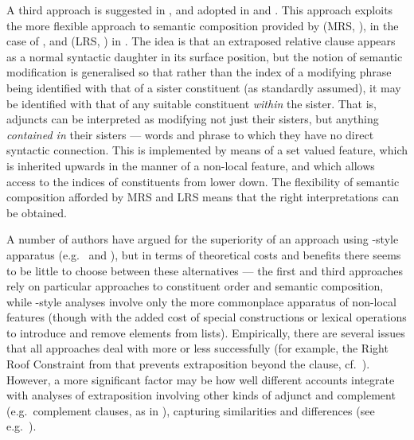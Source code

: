 \documentclass[output=paper
 	        ,biblatex
                ,babelshorthands
                ,newtxmath
                ,draftmode
                ,colorlinks, citecolor=brown
]{langscibook}
\begin{document}
A third approach is suggested in \cite{Kiss2005a}, and adopted in \cite{Crysmann2004a} and
\cite{Walker2017}. This
approach exploits the more flexible approach to semantic composition provided by  (MRS, \citealt{CFPS2005a}), in the case of \cite{Kiss2005a}, and  (LRS, \citealt{richtersailer-lrs04}) in \cite{Walker2017}. The idea is
that an extraposed relative clause appears as a normal syntactic daughter in its surface
position, but the notion of semantic modification is generalised so that rather than the
index of a modifying phrase being identified with that of a sister constituent (as
standardly assumed), it may be identified with that of any suitable constituent
\emph{within} the sister. That is, adjuncts can be interpreted as modifying not just their sisters, but
anything \emph{contained in} their sisters --- words and phrase to which they have no
direct syntactic connection.  This is implemented by means of a set valued
 feature, which is inherited upwards in the manner of a non-local
feature, and which allows access to the indices of constituents from lower down. The
flexibility of semantic composition afforded by MRS and LRS means that the right
interpretations can be obtained.

A number of authors have argued for the superiority of an approach using
-style apparatus (e.g.\ \citealt{Mueller2004b} and \citealt{Crysmann2013a}), but in
terms of theoretical costs and benefits there seems to be little to choose between these
alternatives --- the first and third approaches rely on particular approaches to constituent order
and semantic composition, while -style analyses involve only the more
commonplace apparatus of non-local features (though with the added cost of special
constructions or lexical operations to introduce and remove elements from 
lists). Empirically, there are several issues that all approaches deal with more or less
successfully (for example, the Right Roof Constraint from \citealt{Ross67a-Eng} that prevents
extraposition beyond the clause, cf.\ ). However, a more significant factor may
be how well different accounts integrate with analyses of extraposition involving other kinds of
adjunct and complement (e.g.\ complement clauses, as in ), capturing similarities
and differences (see e.g.\ \citealt{Crysmann2013a}).
\begin{exe}\ex\begin{xlist}
  \label{x:rc-125}
  \label{x:rc-126}
\end{xlist}\end{exe}
\begin{exe}
\end{exe}
  
\end{document}
